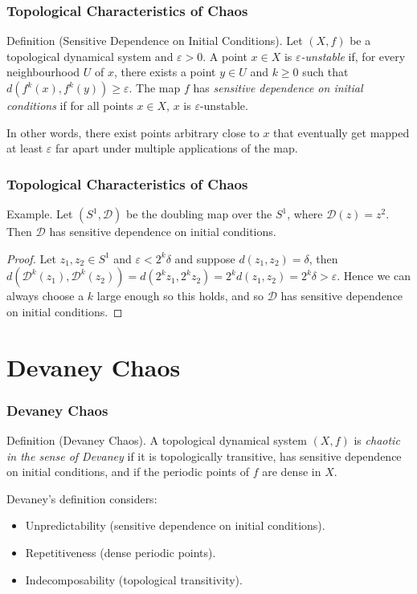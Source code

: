 \documentclass{beamer}
\begin{document}
\begin{frame}
    \frametitle{Topological Characteristics of Chaos}
    \begin{block}{Definition (Sensitive Dependence on Initial Conditions).}
        Let $(X, f)$ be a topological dynamical system and $\varepsilon > 0$. A point $x \in X$ is \emph{$\varepsilon$-unstable} if, for every neighbourhood $U$ of $x$, there exists a point $y \in U$ and $k \geq 0$ such that $d\left(f^k(x), f^k(y)\right) \geq \varepsilon$. The map $f$ has \emph{sensitive dependence on initial conditions} if for all points $x \in X$, $x$ is $\varepsilon$-unstable.
    \end{block}
    \vspace{0.5cm}
    In other words, there exist points arbitrary close to $x$ that eventually get mapped at least $\varepsilon$ far apart under multiple applications of the map.
\end{frame}

\begin{frame}
    \frametitle{Topological Characteristics of Chaos}
    \begin{block}{Example.}
        Let $(S^1, \mathcal{D})$ be the doubling map over the $S^1$, where $\mathcal{D}(z) = z^2$. Then $\mathcal{D}$ has sensitive dependence on initial conditions.
        \begin{proof}
            Let $z_1, z_2 \in S^1$ and $\varepsilon < 2^k \delta$ and suppose $d(z_1, z_2) = \delta$, then $d\left(\mathcal{D}^k(z_1), \mathcal{D}^k(z_2)\right) =  d\left(2^kz_1, 2^kz_2\right) = 2^k d(z_1, z_2) = 2^k \delta > \varepsilon$. Hence we can always choose a $k$ large enough so this holds, and so $\mathcal{D}$ has sensitive dependence on initial conditions.
        \end{proof}
    \end{block}
\end{frame}

\section{Devaney Chaos}
\begin{frame}
    \frametitle{Devaney Chaos}
    \begin{block}{Definition (Devaney Chaos).}
        A topological dynamical system $(X, f)$ is \emph{chaotic in the sense of Devaney} if it is topologically transitive, has sensitive dependence on initial conditions, and if the periodic points of $f$ are dense in $X$.
    \end{block}
    \vspace{0.5cm}
    Devaney's definition considers:
    \begin{itemize}
        \item Unpredictability (sensitive dependence on initial conditions).
        \item Repetitiveness (dense periodic points).
        \item Indecomposability (topological transitivity).
    \end{itemize}
\end{frame}
\end{document}
